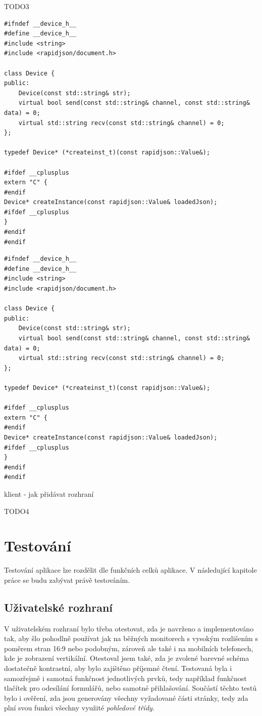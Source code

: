 TODO3

\lstset{language=C++}
\begin{lstlisting}
#ifndef __device_h__
#define __device_h__
#include <string>
#include <rapidjson/document.h>

class Device {
public:
    Device(const std::string& str);
    virtual bool send(const std::string& channel, const std::string& data) = 0;
    virtual std::string recv(const std::string& channel) = 0;
};

typedef Device* (*createinst_t)(const rapidjson::Value&);

#ifdef __cplusplus
extern "C" {
#endif
Device* createInstance(const rapidjson::Value& loadedJson);
#ifdef __cplusplus
}
#endif
#endif

\end{lstlisting}

\begin{verbatim}
#ifndef __device_h__
#define __device_h__
#include <string>
#include <rapidjson/document.h>

class Device {
public:
    Device(const std::string& str);
    virtual bool send(const std::string& channel, const std::string& data) = 0;
    virtual std::string recv(const std::string& channel) = 0;
};

typedef Device* (*createinst_t)(const rapidjson::Value&);

#ifdef __cplusplus
extern "C" {
#endif
Device* createInstance(const rapidjson::Value& loadedJson);
#ifdef __cplusplus
}
#endif
#endif
\end{verbatim}

klient - jak přidávat rozhraní

TODO4

\chapter{Testování}

Testování aplikace lze rozdělit dle funkčních celků aplikace. V následující kapitole práce se budu zabývat právě testováním.

\section{Uživatelské rozhraní}

V uživatelském rozhraní bylo třeba otestovat, zda je navrženo a implementováno tak, aby šlo pohodlně používat jak na běžných monitorech s vysokým rozlišením s poměrem stran 16:9 nebo podobným, zároveň ale také i na mobilních telefonech, kde je zobrazení vertikální. Otestoval jsem také, zda je zvolené barevné schéma dostatečně kontrastní, aby bylo zajištěno příjemné čtení. Testovaná byla i samozřejmě i samotná funkčnost jednotlivých prvků, tedy například funkčnost tlačítek pro odesílání formulářů, nebo samotné přihlašování. Součástí těchto testů bylo i ověření, zda jsou generovány všechny vyžadované části stránky, tedy zda plní svou funkci všechny využité \emph{pohledové třídy}.

